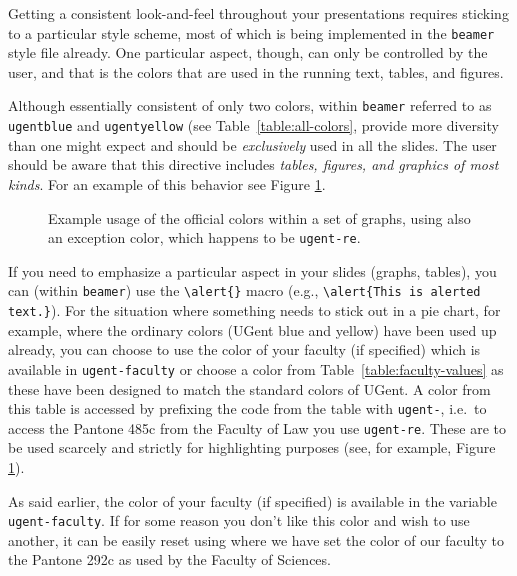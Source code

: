 \documentclass[a4paper,10pt]{article}
\theoremstyle{definition}
\newlength\figurewidth
\newlength\figureheight
\begin{document}
Getting a consistent look-and-feel throughout your presentations requires sticking to a particular style scheme, most of which is being implemented in the \texttt{beamer} style file already. One particular aspect, though, can only be controlled by the user, and that is the colors that are used in the running text, tables, and figures.

Although essentially consistent of only two colors, within \texttt{beamer} referred to as \verb!ugentblue! and \verb!ugentyellow! (see Table~\ref{table:all-colors}, provide more diversity than one might expect and should be \emph{exclusively} used in all the slides. The user should be aware that this directive includes \emph{tables, figures, and graphics of most kinds}. For an example of this behavior see Figure \ref{figure:colored-graphs}.

\setlength\figurewidth{10cm}
\setlength\figureheight{5cm}
\begin{figure}[ht]
  \centering
  
  \caption{Example usage of the official colors within a set of graphs, using also an exception color, which happens to be \texttt{ugent-re}.}
  \label{figure:colored-graphs}
\end{figure}

If you need to emphasize a particular aspect in your slides (graphs, tables), you can (within \texttt{beamer}) use the \verb!\alert{}! macro (e.g., \verb!\alert{This is alerted text.}!). For the situation where something needs to stick out in a pie chart, for example, where the ordinary colors (UGent blue and yellow) have been used up already, you can choose to use the color of your faculty (if specified) which is available in \verb|ugent-faculty| or choose a color from Table~\ref{table:faculty-values} as these have been designed to match the standard colors of UGent. A color from this table is accessed by prefixing the code from the table with \verb|ugent-|, i.e.\ to access the Pantone 485c from the Faculty of Law you use \verb|ugent-re|. These are to be used scarcely and strictly for highlighting purposes (see, for example, Figure \ref{figure:colored-graphs}).

As said earlier, the color of your faculty (if specified) is available in the variable \verb|ugent-faculty|. If for some reason you don't like this color and wish to use another, it can be easily reset using
where we have set the color of our faculty to the Pantone 292c as used by the Faculty of Sciences. 
\end{document}
